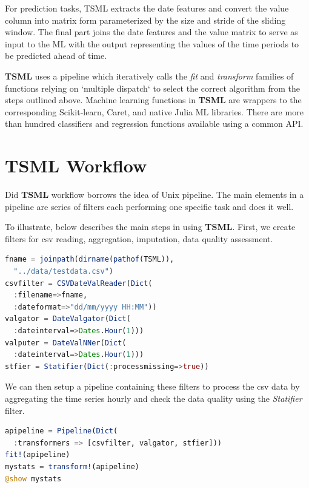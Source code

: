 \documentclass{juliacon}
\begin{document}
For prediction tasks, TSML extracts the date features and 
convert the value column into matrix form parameterized by 
the size and stride of the sliding window. The final part joins
 the date features and the value matrix to serve as input to the 
 ML with the output representing the values of the time periods 
 to be predicted ahead of time.
 
\textbf{TSML} uses a pipeline which iteratively calls the \emph{fit} and \emph{transform}
families of functions relying on `multiple dispatch` to select the correct 
algorithm from the steps outlined above. Machine learning functions in 
\textbf{TSML} are wrappers to the corresponding Scikit-learn, Caret, and native Julia ML libraries. 
There are more than hundred classifiers and regression functions available using a common API.

\section{TSML Workflow}
\label{sec:tsmlworkflow}
%
 Did
\textbf{TSML} workflow borrows the idea of Unix pipeline\cite{orchestra2014, combineml2016}.
The main elements in a pipeline are series of filters
each performing one specific task and does it well. 

\vskip 6pt
To illustrate, below describes the main steps in using \textbf{TSML}.
First, we create filters for csv reading, aggregation, imputation, data quality
assessment.

\begin{lstlisting}[language = Julia]
fname = joinpath(dirname(pathof(TSML)),
  "../data/testdata.csv")
csvfilter = CSVDateValReader(Dict(
  :filename=>fname,
  :dateformat=>"dd/mm/yyyy HH:MM"))
valgator = DateValgator(Dict(
  :dateinterval=>Dates.Hour(1)))
valputer = DateValNNer(Dict(
  :dateinterval=>Dates.Hour(1)))
stfier = Statifier(Dict(:processmissing=>true))
\end{lstlisting}

We can then setup a pipeline containing these filters to process the csv data
by aggregating the time series hourly and check the data quality using the
\emph{Statifier} filter.

\begin{lstlisting}[language = Julia]
apipeline = Pipeline(Dict(
  :transformers => [csvfilter, valgator, stfier]))
fit!(apipeline)
mystats = transform!(apipeline)
@show mystats
\end{lstlisting}
\end{document}
